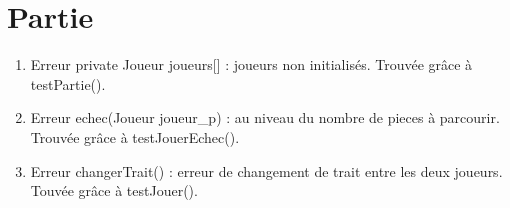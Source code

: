 \section{Partie}
\begin{enumerate}
\item
 Erreur private Joueur joueurs[] : joueurs non initialisés. Trouvée grâce à testPartie().
\item
Erreur echec(Joueur joueur\_p) :  au niveau du nombre de pieces à parcourir. Trouvée grâce à  testJouerEchec().
\item
Erreur changerTrait() : erreur de changement de trait entre les deux joueurs. Touvée grâce à testJouer().

\end{enumerate}
